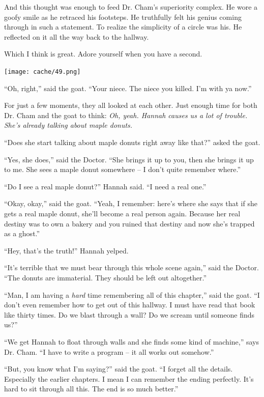 \documentclass[12pt,twoside]{report}
\begin{document}
And this thought was enough to feed Dr. Cham's superiority complex.
He wore a goofy smile as he retraced his footsteps.  He truthfully
felt his genius coming through in such a statement.  To realize the
simplicity of a circle was his.  He reflected on it all the way back
to the hallway.

Which I think is great.  Adore yourself when you have a second.

	\texttt{[image: cache/49.png]}

``Oh, right,'' said the goat.  ``Your niece.  The niece you killed.
        I'm with ya now.''

For just a few moments, they all looked at each other.  Just enough
time for both Dr. Cham and the goat to think: {\em Oh, yeah.  Hannah
  causes us a lot of trouble.  She's already talking about maple
  donuts.}

``Does she start talking about maple donuts right away like that?''
asked the goat.

``Yes, she does,'' said the Doctor.  ``She brings it up to you, then
she brings it up to me.  She sees a maple donut somewhere -- I don't
quite remember where.''

``Do I see a real maple donut?'' Hannah said.  ``I need a real one.''

``Okay, okay,'' said the goat.  ``Yeah, I remember: here's where she
says that if she gets a real maple donut, she'll become a real person
again. Because her real destiny was to own a bakery and you ruined
that destiny and now she's trapped as a ghost.''

``Hey, that's the truth!'' Hannah yelped.

``It's terrible that we must bear through this whole scene again,''
said the Doctor.  ``The donuts are immaterial.  They should be left
out altogether.''

``Man, I am having a {\em hard} time remembering all of this
chapter,'' said the goat.  ``I don't even remember how to get out of
this hallway.  I must have read that book like thirty times.  Do we
blast through a wall?  Do we scream until someone finds us?''

``We get Hannah to float through walls and she finds some kind of
machine,'' says Dr. Cham.  ``I have to write a program -- it all works
out somehow.''

``But, you know what I'm saying?'' said the goat.  ``I forget all the
details. Especially the earlier chapters.  I mean I can remember the
ending perfectly. It's hard to sit through all this.  The end is so
much better.''
\end{document}
